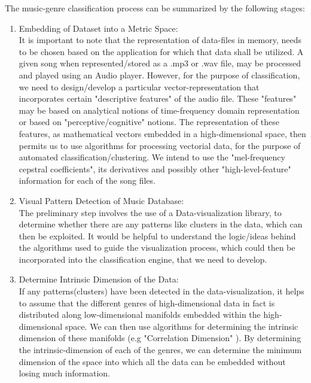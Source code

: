 \documentclass[10pt]{article}
\begin{document}
The music-genre classification process can be summarized by the following stages: 
\begin{enumerate}
\item Embedding of Dataset into a Metric Space:\\
It is important to note that the representation of data-files in memory, needs to be chosen based on the application for which that data shall be utilized. A given song when represented/stored as a .mp3 or .wav file, may be processed and played using an Audio player. However, for the purpose of classification, we need to design/develop a particular vector-representation that incorporates certain "descriptive features" of the audio file. These "features" may be based on analytical notions of time-frequency domain representation or based on "perceptive/cognitive" notions. The representation of these features, as mathematical vectors embedded in a high-dimensional space, then permits us to use algorithms for processing vectorial data, for the purpose of automated classification/clustering. We intend to use the "mel-frequency cepstral coefficients", its derivatives and possibly other "high-level-feature" information for each of the song files. 

\item Visual Pattern Detection of Music Database: \\
The preliminary step involves the use of a Data-visualization library, to determine whether there are any patterns like clusters in the data, which can then be exploited. It would be helpful to understand the logic/ideas behind the algorithms used to guide the visualization process, which could then be incorporated into the classification engine, that we need to develop. 

\item Determine Intrinsic Dimension of the Data:\\
If any patterns(clusters) have been detected in the data-visualization, it helps to assume that the different genres of high-dimensional data in fact is distributed along low-dimensional manifolds embedded within the high-dimensional space. We can then use algorithms for determining the intrinsic dimension of these manifolds (e.g "Correlation Dimension" ). By determining the intrinsic-dimension of each of the genres, we can determine the minimum dimension of the space into which all the data can be embedded without losing much information. 


\end{enumerate}
\end{document}
